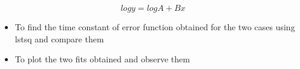 \documentclass[11pt]{article}
\providecommand{\tightlist}{%
      \setlength{\itemsep}{0pt}\setlength{\parskip}{0pt}}
\begin{document}
\begin{equation}
    logy = logA + Bx
\end{equation}

\begin{itemize}
\tightlist
\item
  To find the time constant of error function obtained for the two cases
  using lstsq and compare them
\item
  To plot the two fits obtained and observe them
\end{itemize}

	

	
		
	
	
		
			
		
	
		
			
		
	
		
			
		
	
		
			
		
	
		
			
		
	
		
			
		
	
		
			
		
	
		
			
		
	
		
			
		
	
		
			
		
	
		
			
		
	
\end{document}
